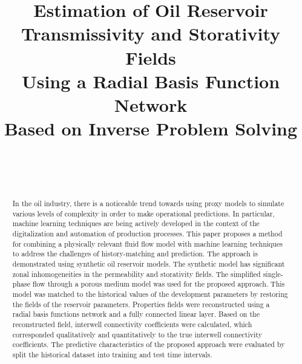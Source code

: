 \documentclass[
11pt,%
tightenlines,%
twoside,%
onecolumn,%
nofloats,%
nobibnotes,%
nofootinbib,%
superscriptaddress,%
noshowpacs,%
centertags]%
{revtex4}
\begin{document}

\title{Estimation of Oil Reservoir \\ Transmissivity and Storativity Fields \\ Using a Radial Basis Function Network \\ Based on Inverse Problem Solving}

\author{~}


\author{~}




\begin{abstract} %
In the oil industry, there is a noticeable trend towards using proxy models to simulate various levels of complexity in order to make operational predictions. In particular, machine learning techniques are being actively developed in the context of the digitalization and automation of production processes.
This paper proposes a method for combining a physically relevant fluid flow model with machine learning techniques to address the challenges of history-matching and prediction. The approach is demonstrated using synthetic oil reservoir models. 
The synthetic model has significant zonal inhomogeneities in the permeability and storativity fields.
The simplified single-phase flow through a porous medium model was used for the proposed approach. This model was matched to the historical values of the development parameters by restoring the fields of the reservoir parameters. Properties fields were reconstructed using a radial basis functions network and a fully connected linear layer.
Based on the reconstructed field, interwell connectivity coefficients were calculated, which corresponded qualitatively and quantitatively to the true interwell connectivity coefficients. The predictive characteristics of the proposed approach were evaluated by split the historical dataset into training and test time intervals.
\end{abstract}
\end{document}
